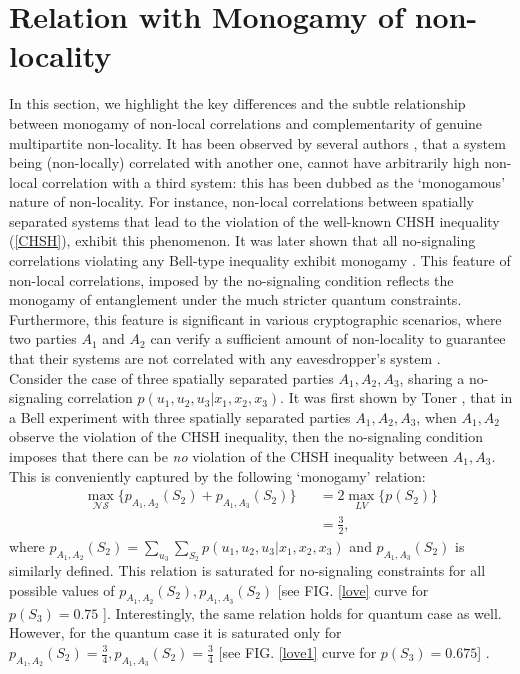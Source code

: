 \documentclass[%
 reprint,
 amsmath,amssymb,
 aps,
]{revtex4-1}
\theoremstyle{plain}
\begin{document}
\section{Relation with Monogamy of non-locality}
In this section, we highlight the key differences and the subtle relationship between monogamy of non-local correlations and complementarity of genuine multipartite non-locality. It has been observed by several authors \cite{toner2009monogamy,san2009entanglement,pawlowski2009monogamy,ramanathan2012generalized,bai2014general,osborne2006general,koashi2004monogamy,hiroshima2007monogamy}, that a system being (non-locally) correlated with another one, cannot have arbitrarily high non-local correlation with a third system: this has been dubbed as the `monogamous' nature of non-locality.
For instance, non-local correlations between spatially separated systems that lead to the violation of the well-known CHSH inequality (\ref{CHSH}), exhibit this phenomenon. It was later shown that all no-signaling correlations violating any Bell-type inequality exhibit monogamy \cite{pawlowski2009monogamy}. This feature of non-local correlations, imposed by the no-signaling condition reflects the monogamy of entanglement under the much stricter quantum constraints. Furthermore, this feature is significant in various cryptographic scenarios, where two parties $A_1$ and $A_2$ can verify a sufficient amount of non-locality to guarantee that their systems are not correlated with any eavesdropper's system \cite{toner2009monogamy}. \\
Consider the case of three spatially separated parties $A_1,A_2,A_3$, sharing a no-signaling correlation $p(u_1,u_2,u_3|x_1,x_2,x_3)$. 
It was first shown by Toner \cite{toner2009monogamy}, that in a Bell experiment with three spatially separated parties $A_1,A_2,A_3$, when $A_1,A_2$ observe the violation of the CHSH inequality, then the no-signaling condition imposes that there can be \textit{no} violation of the CHSH inequality between $A_1,A_3$. This is conveniently captured by the following `monogamy' relation:
\begin{eqnarray}
\label{mono}
\nonumber
\max_{\mathcal{NS}}\{p_{A_1,A_2}(S_2)+p_{A_1,A_3}(S_2)\} && = 2\max_{LV}\{p(S_2)\} \\  && =\frac{3}{2},
\end{eqnarray}
where
$p_{A_1,A_2}(S_2)=\sum_{u_3}\sum_{S_2}p(u_1,u_2,u_3|x_1,x_2,x_3)$ and $p_{A_1,A_3}(S_2)$ is similarly defined. This relation is saturated for no-signaling constraints for all possible values of $p_{A_1,A_2}(S_2),p_{A_1,A_3}(S_2)$ [see FIG. \ref{love} curve for $p(S_3)=0.75$ ]. Interestingly, the same relation holds for quantum case as well. However, for the quantum case it is saturated only for $p_{A_1,A_2}(S_2)=\frac{3}{4},p_{A_1,A_3}(S_2)=\frac{3}{4}$ [see FIG. \ref{love1} curve for $p(S_3)=0.675$] . \\
\end{document}
